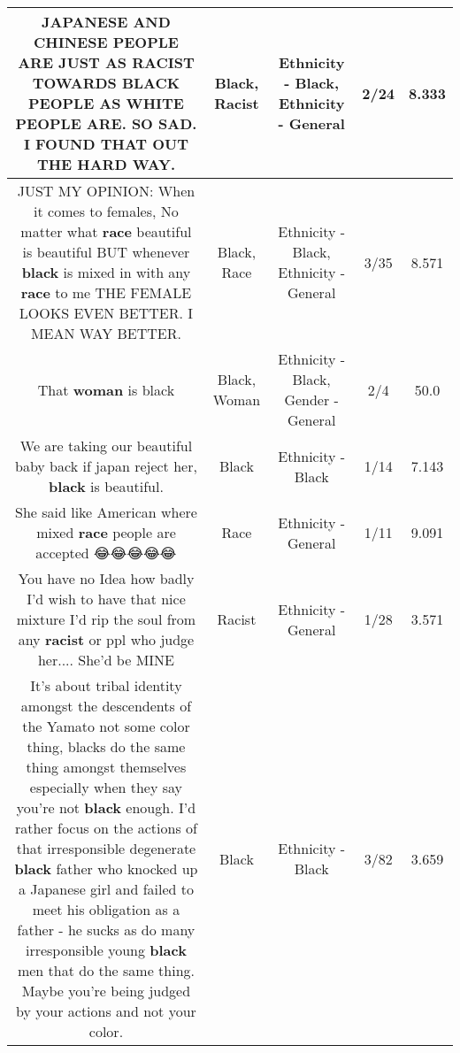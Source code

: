 \documentclass[11pt]{article}
\newlength\mylength
\begin{document}
\begin{center}
\begin{longtable}{|C{.65\mylength}|C{.30\mylength}|C{.12\mylength}|C{.12\mylength}|C{.12\mylength}|}
  \small JAPANESE AND CHINESE PEOPLE ARE JUST AS \textbf{RACIST} TOWARDS \textbf{BLACK} PEOPLE AS WHITE PEOPLE ARE. SO SAD. I FOUND THAT OUT THE HARD WAY.\normalsize   & Black, Racist & Ethnicity - Black, Ethnicity - General & 2/24 & 8.333 \\  \hline
  \small JUST MY OPINION: When it comes to females, No matter what \textbf{race} beautiful is beautiful BUT whenever \textbf{black} is mixed in with any \textbf{race} to me THE FEMALE LOOKS EVEN BETTER. I MEAN WAY BETTER.\normalsize   & Black, Race & Ethnicity - Black, Ethnicity - General & 3/35 & 8.571 \\  \hline
  \small That \textbf{woman} is black\normalsize   & Black, Woman & Ethnicity - Black, Gender - General & 2/4 & 50.0 \\  \hline
  \small We are taking our beautiful baby back if japan reject her, \textbf{black} is beautiful.\normalsize   & Black & Ethnicity - Black & 1/14 & 7.143 \\  \hline
  \small She said like American where mixed \textbf{race} people are accepted 😂😂😂😂😂\normalsize   & Race & Ethnicity - General & 1/11 & 9.091 \\  \hline
  \small You have no Idea how badly I'd wish to have that nice mixture I'd rip the soul from any \textbf{racist} or ppl who judge her.... She'd be MINE\normalsize   & Racist & Ethnicity - General & 1/28 & 3.571 \\  \hline
  \small It's about tribal identity amongst  the descendents of the Yamato not some color thing, blacks do the same thing amongst themselves especially when they say you're not \textbf{black} enough. I'd rather focus on the actions of that irresponsible degenerate \textbf{black} father who knocked up a Japanese girl and failed to meet his obligation as a father - he sucks as do many irresponsible young \textbf{black} men that do the same thing. Maybe you're being judged by your actions and not your color.\normalsize   & Black & Ethnicity - Black & 3/82 & 3.659 \\  \hline

\end{longtable}
\end{center}
\end{document}

